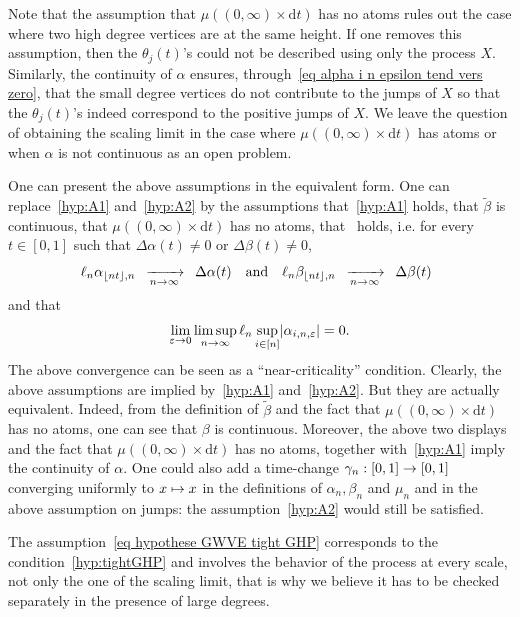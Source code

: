 \documentclass[AHL,Unicode,published]{cedram}
\newcommand{\e}{\varepsilon}
\newcommand{\cv}[1][n]{\enskip\xrightarrow[#1 \to \infty]{}\enskip}
\newcommand{\rmd}{\mathrm{d}}
\newcommand{\1}{\mathbbm{1}}
\let\originalleft\left
\let\originalright\right
\renewcommand{\left}{\mathopen{}\mathclose\bgroup\originalleft}
\renewcommand{\right}{\aftergroup\egroup\originalright}
\renewcommand*{\to}{\mathchoice{\longrightarrow}{\rightarrow}{\rightarrow}{\rightarrow}}
\let\oldmapsto\mapsto
\renewcommand*{\mapsto}{\mathchoice{\longmapsto}{\oldmapsto}{\oldmapsto}{\oldmapsto}}
\begin{document}
\begin{rema}\label{remarque pas de grands degrés à la meme hauteur}
Note that the assumption that $\mu((0,\infty)\times \rmd t)$ has no atoms rules out the case where two high degree vertices are at the same height. If one removes this assumption, then the $\theta_j(t)$'s could not be described using only the process $X$. {Similarly, the continuity of $\alpha$ ensures, through~\eqref{eq alpha i n epsilon tend vers zero}, that the small degree vertices do not contribute to the jumps of $X$ so that the $\theta_j(t)$'s indeed correspond to the positive jumps of $X$.} {We leave the question of obtaining the scaling limit in the case where $\mu((0,\infty)\times \rmd t)$ has atoms or when $\alpha$ is not continuous as an open problem.}
\end{rema}


\begin{rema}
One can present the above assumptions in the equivalent form. One can replace~\ref{hyp:A1} and~\ref{hyp:A2} by the assumptions that~\ref{hyp:A1} holds, that $\widetilde{\beta}$ is continuous, that $\mu((0,\infty)\times \rmd t)$ has no atoms, that~\cite[Assumption~(A2)]{BS15} holds, i.e. for every $t \in [0,1]$ such that $\Delta \alpha(t) \neq 0$ or $\Delta\beta(t) \neq 0$,
\[
{\ell_n} \alpha_{\lfloor n t \rfloor, n} \cv[n] \Delta \alpha (t)
\quad \text{and} \quad {\ell_n} \beta_{\lfloor n t \rfloor, n}\cv[n] \Delta \beta (t) \enskip
\]
and that
\[
\lim_{\e \to 0} \limsup_{n\to \infty} \ell_n \sup_{i \in [n]} \left| \alpha_{i,n,\e} \right| =0.
\]
The above convergence can be seen as a ``near-criticality'' condition. Clearly, the above assumptions are implied by~\ref{hyp:A1} and~\ref{hyp:A2}. But they are actually equivalent. Indeed, from the definition of $\widetilde{\beta}$ and the fact that $\mu((0,\infty)\times \rmd t)$ has no atoms, one can see that $\beta$ is continuous. Moreover, the above two displays and the fact that $\mu((0,\infty)\times \rmd t)$ has no atoms, together with~\ref{hyp:A1} imply the continuity of $\alpha$. One could also add a time-change $\gamma_n : [0,1]\to [0,1]$ converging uniformly to $x\mapsto x$ in the definitions of $\alpha_n, \beta_n$ and $\mu_n$ and in the above assumption on jumps: the assumption~\ref{hyp:A2} would still be satisfied.
\end{rema}

\begin{rema}
The assumption~\eqref{eq hypothese GWVE tight GHP} corresponds to the condition~\ref{hyp:tightGHP} and involves the behavior of the process at every scale, not only the one of the scaling limit, that is why we believe it has to be checked separately in the presence of large degrees.
\end{rema}
\end{document}
